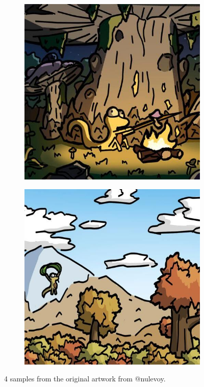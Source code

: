 \documentclass{article}
\begin{document}
\begin{figure}[h]
\begin{subfigure}[b]{0.24\textwidth}
     \end{subfigure}
     \hfill
     \begin{subfigure}[b]{0.24\textwidth}
         \centering
         \includegraphics[width=\textwidth]{plots/process/original/0005.jpg}
     \end{subfigure}
     \hfill
     \begin{subfigure}[b]{0.24\textwidth}
         \centering
         \includegraphics[width=\textwidth]{plots/process/original/0009.jpg}
     \end{subfigure}
    \caption{4 samples from the original artwork from @nulevoy.}
    \label{fig:proc-original}
\end{figure}
\end{document}
